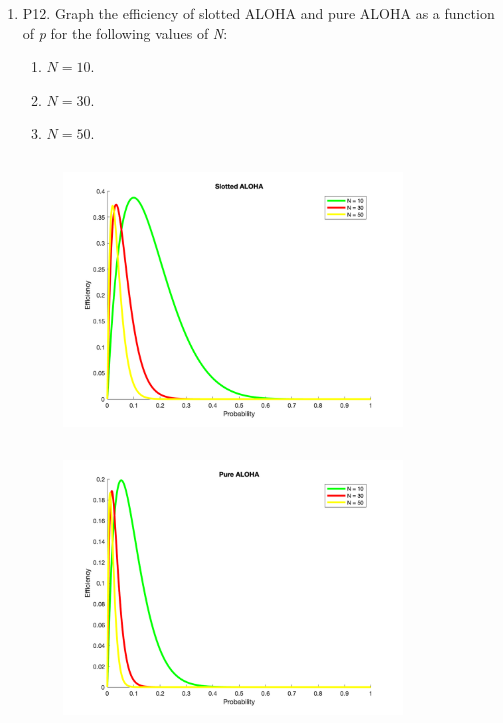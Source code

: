 \documentclass[12pt]{article}
\begin{document}
\begin{enumerate}
    \item P12. Graph the efficiency of slotted ALOHA and pure ALOHA as a function of \textit{p} for the following values of \textit{N}:
    \begin{enumerate}
        \item \(N=10\).
        \item \(N=30\).
        \item \(N=50\).
    \end{enumerate}
    \inputminted[frame=lines,linenos]{python}{./Matlab/ECE540_Ch6_P12_1.m}
    \begin{figure}[h!]
        \centering
        \includegraphics[width=0.85\textwidth]{./Matlab/fig1.png}
    \end{figure}
    \inputminted[frame=lines,linenos]{python}{./Matlab/ECE540_Ch6_P12_2.m}
    \begin{figure}[h!]
        \centering
        \includegraphics[width=0.85\textwidth]{./Matlab/fig2.png}

\end{figure}
\end{enumerate}
\end{document}
